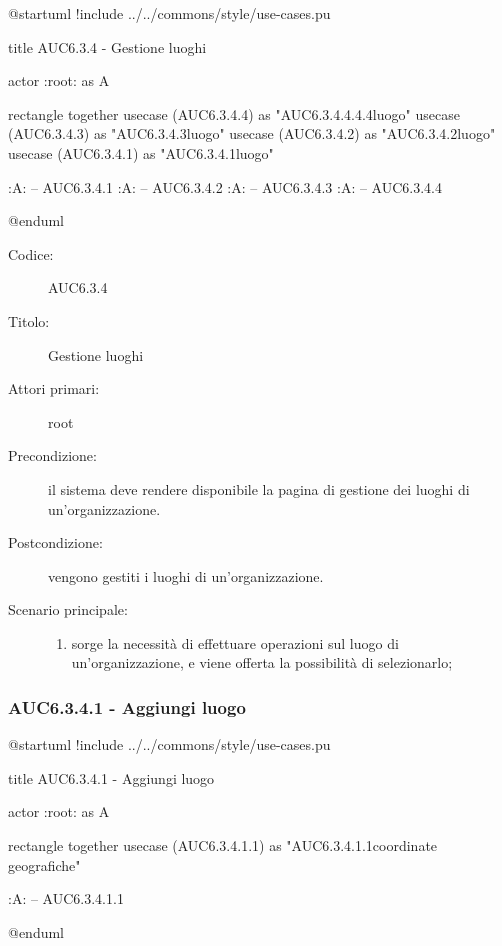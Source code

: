 \documentclass[casi-duso]{subfiles}
\begin{document}
\begin{plantuml}
@startuml
!include ../../commons/style/use-cases.pu

title AUC6.3.4 - Gestione luoghi

actor :root: as A

rectangle {
  together {
    usecase (AUC6.3.4.4) as "AUC6.3.4.4.4.4\nSeleziona luogo"
    usecase (AUC6.3.4.3) as "AUC6.3.4.3\nModifica luogo"
    usecase (AUC6.3.4.2) as "AUC6.3.4.2\nEliminazione luogo"
    usecase (AUC6.3.4.1) as "AUC6.3.4.1\nAggiungi luogo"
  }
}

:A: -- AUC6.3.4.1
:A: -- AUC6.3.4.2
:A: -- AUC6.3.4.3
:A: -- AUC6.3.4.4

@enduml
\end{plantuml}

\begin{description}
  \item[Codice:] AUC6.3.4
  \item[Titolo:] Gestione luoghi
  \item[Attori primari:] root
  \item[Precondizione:] il sistema deve rendere disponibile la pagina di gestione dei luoghi di un'organizzazione.
  \item[Postcondizione:] vengono gestiti i luoghi di un'organizzazione.
  \item[Scenario principale:]
  \begin{enumerate}
    \item sorge la necessità di effettuare operazioni sul luogo di un'organizzazione, e viene offerta la possibilità di selezionarlo;
  \end{enumerate}
\end{description}

\subsubsection{AUC6.3.4.1 - Aggiungi luogo}%
\label{subsub:AUC6.3.4.1}

\begin{plantuml}
@startuml 
!include ../../commons/style/use-cases.pu

title AUC6.3.4.1 - Aggiungi luogo

actor :root: as A

rectangle {
  together {
    usecase (AUC6.3.4.1.1) as "AUC6.3.4.1.1\nInserisci coordinate geografiche"
  }
}

:A: -- AUC6.3.4.1.1

@enduml
\end{plantuml}
\end{document}
